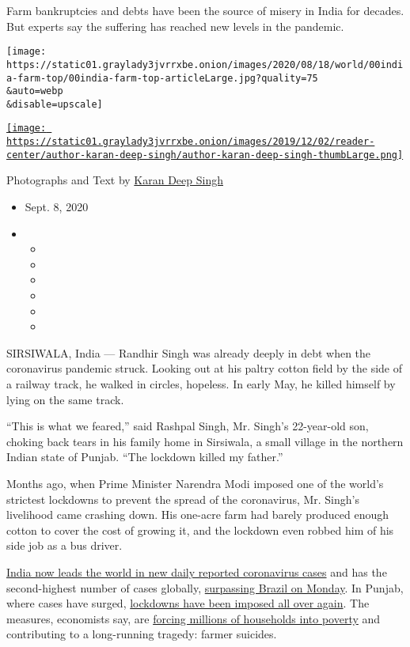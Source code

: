 Farm bankruptcies and debts have been the source of misery in India for
decades. But experts say the suffering has reached new levels in the
pandemic.

\texttt{[image: https://static01.graylady3jvrrxbe.onion/images/2020/08/18/world/00india-farm-top/00india-farm-top-articleLarge.jpg?quality=75\\\&auto=webp\\\&disable=upscale]}

\href{https://www.nytimes3xbfgragh.onion/by/karan-deep-singh}{\texttt{[image: https://static01.graylady3jvrrxbe.onion/images/2019/12/02/reader-center/author-karan-deep-singh/author-karan-deep-singh-thumbLarge.png]}}

Photographs and Text by
\href{https://www.nytimes3xbfgragh.onion/by/karan-deep-singh}{Karan Deep
Singh}

\begin{itemize}
\item
  Sept. 8, 2020
\item
  \begin{itemize}
  \item
  \item
  \item
  \item
  \item
  \item
  \end{itemize}
\end{itemize}

SIRSIWALA, India --- Randhir Singh was already deeply in debt when the
coronavirus pandemic struck. Looking out at his paltry cotton field by
the side of a railway track, he walked in circles, hopeless. In early
May, he killed himself by lying on the same track.

``This is what we feared,'' said Rashpal Singh, Mr. Singh's 22-year-old
son, choking back tears in his family home in Sirsiwala, a small village
in the northern Indian state of Punjab. ``The lockdown killed my
father.''

Months ago, when Prime Minister Narendra Modi imposed one of the world's
strictest lockdowns to prevent the spread of the coronavirus, Mr.
Singh's livelihood came crashing down. His one-acre farm had barely
produced enough cotton to cover the cost of growing it, and the lockdown
even robbed him of his side job as a bus driver.

\href{https://www.nytimes3xbfgragh.onion/2020/08/28/world/asia/india-coronavirus.html}{India
now leads the world in new daily reported coronavirus cases} and has the
second-highest number of cases globally,
\href{https://www.nytimes3xbfgragh.onion/2020/09/07/world/covid-19-coronavirus.html}{surpassing
Brazil on Monday}. In Punjab, where cases have surged,
\href{https://www.nytimes3xbfgragh.onion/2020/07/16/world/asia/coronavirus-india-million-cases.html}{lockdowns
have been imposed all over again}. The measures, economists say, are
\href{https://link.springer.com/content/pdf/10.1007/s40812-020-00170-x.pdf}{forcing
millions of households into poverty} and contributing to a long-running
tragedy: farmer suicides.

